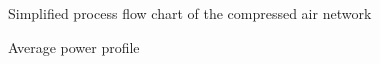 \begin{figure}[h!]
	\centering
	\caption{Simplified process flow chart of the compressed air network}
	\label{fig: Beatrix Air layout}
\end{figure}
\clearpage
\begin{figure}[h!]
	\centering
	
	\caption{Average power profile}
	\label{fig: Beatrix power baseline}
\end{figure}

